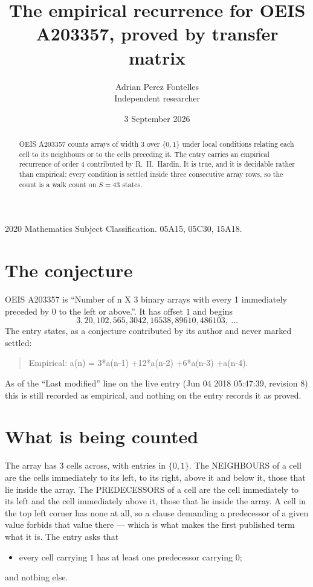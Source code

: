 \documentclass[11pt,a4paper]{article}
\title{The empirical recurrence for OEIS A203357, proved by transfer matrix}
\author{Adrian Perez Fontelles\\ \small Independent researcher}
\date{3 September 2026}
\theoremstyle{plain}
\theoremstyle{definition}
\begin{document}
\maketitle

\begin{abstract}
OEIS A203357 counts arrays of width $3$ over $\{0,1\}$ under local conditions relating each cell
to its neighbours or to the cells preceding it. The entry carries an empirical recurrence of
order $4$ contributed by R.~H.~Hardin. It is true, and it is decidable rather than
empirical: every condition is settled inside three consecutive array rows, so the count is a
walk count on $S=43$ states.
\end{abstract}

\noindent\small 2020 Mathematics Subject Classification. 05A15, 05C30, 15A18.\normalsize

\section{The conjecture}

OEIS A203357 is ``Number of n X 3 binary arrays with every 1 immediately preceded by 0 to the left or above.''. It has offset $1$ and begins
\[
3, 20, 102, 565, 3042, 16538, 89610, 486103,\ \dots
\]
The entry states, as a conjecture contributed by its author and never marked settled:
\begin{quote}
Empirical: a(n) = 3*a(n-1) +12*a(n-2) +6*a(n-3) +a(n-4).
\end{quote}
As of the ``Last modified'' line on the live entry (Jun 04 2018 05:47:39, revision 8) this is still
recorded as empirical, and nothing on the entry records it as proved.

\section{What is being counted}

The array has $3$ cells across, with entries in $\{0,1\}$. The NEIGHBOURS of a cell are the
cells immediately to its left, to its right, above it and below it, those that lie inside the
array. The PREDECESSORS of a cell are the cell immediately to its left and the cell
immediately above it, those that lie inside the array. A cell in the top left corner has none
at all, so a clause demanding a predecessor of a given value forbids that value there --- which
is what makes the first published term what it is. The entry asks that
\begin{itemize}
\item every cell carrying $1$ has at least one predecessor carrying $0$;
\end{itemize}
and nothing else.
\end{document}
